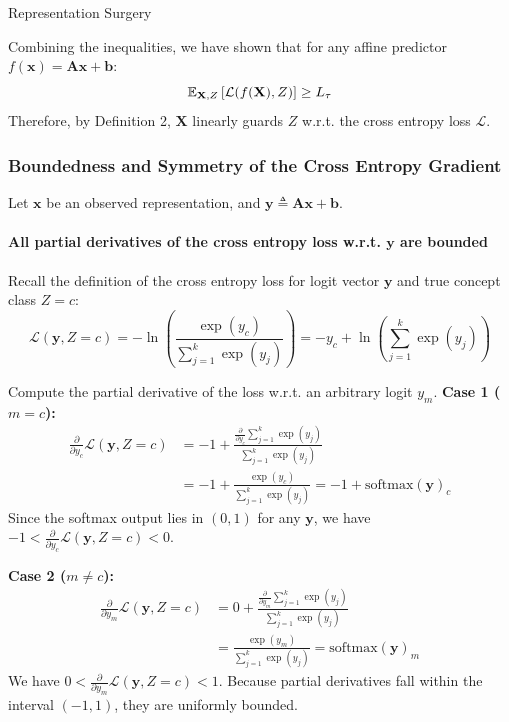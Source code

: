\begin{question}{Representation Surgery}
\begin{subquestion}
Combining the inequalities, we have shown that for any affine predictor $f(\mathbf{x}) = \mathbf{A}\mathbf{x} + \mathbf{b}$:
\begin{equation}
    \expectation_{\mathbf{X}, Z}\left[\mathcal{L}(f(\mathbf{X}), Z)\right] \geq L_\tau
\end{equation}
Therefore, by Definition 2, $\mathbf{X}$ linearly guards $Z$ w.r.t. the cross entropy loss $\mathcal{L}$.

\end{subquestion}

\begin{subquestion}

\subsubsection*{Boundedness and Symmetry of the Cross Entropy Gradient}

Let $\mathbf{x}$ be an observed representation, and $\mathbf{y} \triangleq \mathbf{A}\mathbf{x} + \mathbf{b}$.

\paragraph{All partial derivatives of the cross entropy loss w.r.t. $\mathbf{y}$ are bounded}

Recall the definition of the cross entropy loss for logit vector $\mathbf{y}$ and true concept class $Z = c$:
\begin{equation}
    \mathcal{L}(\mathbf{y}, Z = c) = -\ln\left(\frac{\exp(y_c)}{\sum_{j=1}^k \exp(y_j)}\right) = -y_c + \ln\left(\sum_{j=1}^k \exp(y_j)\right)
\end{equation}

Compute the partial derivative of the loss w.r.t. an arbitrary logit $y_m$.
\textbf{Case 1 ($m = c$):}
\begin{align}
    \frac{\partial}{\partial y_c}\mathcal{L}(\mathbf{y}, Z = c)
    &= -1 + \frac{\frac{\partial}{\partial y_c}\sum_{j=1}^k \exp(y_j)}{\sum_{j=1}^k \exp(y_j)} \\
    &= -1 + \frac{\exp(y_c)}{\sum_{j=1}^k \exp(y_j)} = -1 + \mathrm{softmax}(\mathbf{y})_c
\end{align}
Since the softmax output lies in $(0, 1)$ for any $\mathbf{y}$, we have $-1 < \frac{\partial}{\partial y_c}\mathcal{L}(\mathbf{y}, Z = c) < 0$.

\textbf{Case 2 ($m \neq c$):}
\begin{align}
    \frac{\partial}{\partial y_m}\mathcal{L}(\mathbf{y}, Z = c)
    &= 0 + \frac{\frac{\partial}{\partial y_m}\sum_{j=1}^k \exp(y_j)}{\sum_{j=1}^k \exp(y_j)} \\
    &= \frac{\exp(y_m)}{\sum_{j=1}^k \exp(y_j)} = \mathrm{softmax}(\mathbf{y})_m
\end{align}
We have $0 < \frac{\partial}{\partial y_m}\mathcal{L}(\mathbf{y}, Z = c) < 1$. Because partial derivatives fall within the interval $(-1, 1)$, they are uniformly bounded.


\end{subquestion}
\end{question}
